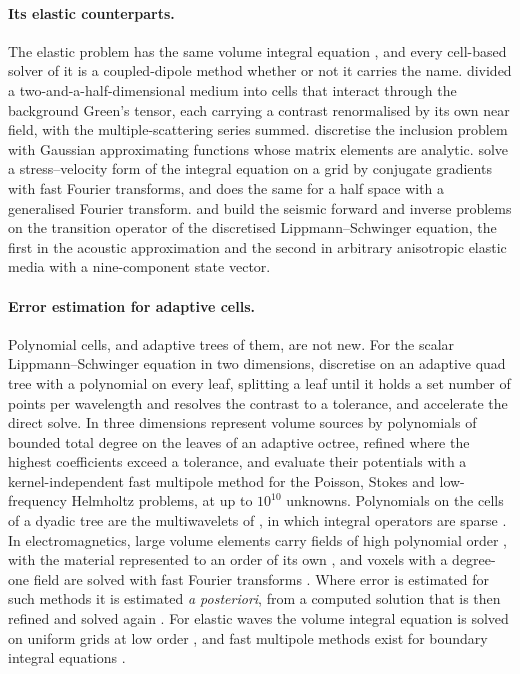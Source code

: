\documentclass[11pt,a4paper]{article}
\begin{document}
\paragraph{Its elastic counterparts.} The elastic problem has the same volume integral equation
\citep{Gubernatis1977}, and every cell-based solver of it is a coupled-dipole method whether or not
it carries the name. \citet{Nestor1996} divided a two-and-a-half-dimensional medium into cells that
interact through the background Green's tensor, each carrying a contrast renormalised by its own
near field, with the multiple-scattering series summed. \citet{Kanaun2013} discretise the inclusion
problem with Gaussian approximating functions whose matrix elements are analytic. \citet{Yang2008}
solve a stress--velocity form of the integral equation on a grid by conjugate gradients with fast
Fourier transforms, and \citet{Touhei2011} does the same for a half space with a generalised Fourier
transform. \citet{Jakobsen2012} and \citet{Jakobsen2020} build the seismic forward and inverse problems on the
transition operator of the discretised Lippmann--Schwinger equation, the first in the acoustic
approximation and the second in arbitrary anisotropic elastic media with a nine-component state vector.


\paragraph{Error estimation for adaptive cells.} Polynomial cells, and adaptive trees of them, are not new. For the scalar Lippmann--Schwinger equation in two
dimensions, \citet{Ambikasaran2015} discretise on an adaptive quad tree with a polynomial on every
leaf, splitting a leaf until it holds a set number of points per wavelength and resolves the contrast to
a tolerance, and \citet{Gopal2020} accelerate the direct solve. In three dimensions
\citet{Malhotra2015,Malhotra2016} represent volume sources by polynomials of bounded total degree on
the leaves of an adaptive octree, refined where the highest coefficients exceed a tolerance, and
evaluate their potentials with a kernel-independent fast multipole method \citep{Ying2004} for the
Poisson, Stokes and low-frequency Helmholtz problems, at up to $10^{10}$ unknowns. Polynomials on the
cells of a dyadic tree are the multiwavelets of \citet{Alpert1993}, in which integral operators are
sparse \citep{Alpert1993b}. In electromagnetics, large volume elements carry fields of high polynomial
order \citep{Chobanyan2013}, with the material represented to an order of its own \citep{Chobanyan2015},
and voxels with a degree-one field are solved with fast Fourier transforms \citep{Georgakis2020}. Where
error is estimated for such methods it is estimated \emph{a posteriori}, from a computed solution that
is then refined and solved again \citep{Beilina2022}. For elastic waves the volume integral equation is
solved on uniform grids at low order \citep{Shekhar2023}, and fast multipole methods exist for boundary
integral equations \citep{Fujiwara2000,Chaillat2008}.
\end{document}
